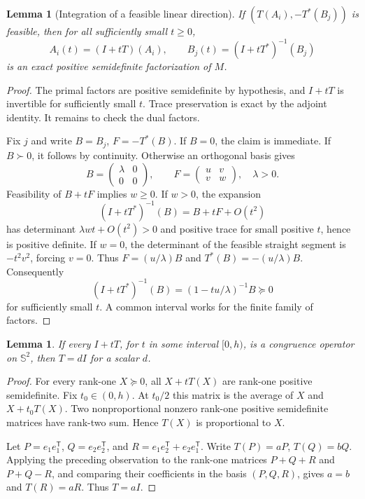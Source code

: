 \documentclass[11pt]{article}
\newtheorem{lemma}[theorem]{Lemma}
\newcommand{\Sym}{\mathbb S^2}
\begin{document}
\begin{lemma}[Integration of a feasible linear direction]\label{lem:integrate}
If $(T(A_i),-T^*(B_j))$ is feasible, then for all sufficiently small $t\geq0$,
\[
 A_i(t)=(I+tT)(A_i),\qquad
 B_j(t)=(I+tT^*)^{-1}(B_j)
\]
is an exact positive semidefinite factorization of $M$.
\end{lemma}
\begin{proof}
The primal factors are positive semidefinite by hypothesis, and $I+tT$ is invertible for sufficiently small $t$. Trace preservation is exact by the adjoint identity. It remains to check the dual factors.

Fix $j$ and write $B=B_j$, $F=-T^*(B)$. If $B=0$, the claim is immediate. If $B\succ0$, it follows by continuity. Otherwise an orthogonal basis gives
\[
 B=\begin{pmatrix}\lambda&0\\0&0\end{pmatrix},\qquad
 F=\begin{pmatrix}u&v\\v&w\end{pmatrix},\quad \lambda>0.
\]
Feasibility of $B+tF$ implies $w\geq0$. If $w>0$, the expansion
\[
 (I+tT^*)^{-1}(B)=B+tF+O(t^2)
\]
has determinant $\lambda wt+O(t^2)>0$ and positive trace for small positive $t$, hence is positive definite. If $w=0$, the determinant of the feasible straight segment is $-t^2v^2$, forcing $v=0$. Thus $F=(u/\lambda)B$ and $T^*(B)=-(u/\lambda)B$. Consequently
\[
 (I+tT^*)^{-1}(B)=(1-tu/\lambda)^{-1}B\succeq0
\]
for sufficiently small $t$. A common interval works for the finite family of factors.
\end{proof}

\begin{lemma}\label{lem:line}
If every $I+tT$, for $t$ in some interval $[0,h)$, is a congruence operator on $\Sym$, then $T=dI$ for a scalar $d$.
\end{lemma}
\begin{proof}
For every rank-one $X\succeq0$, all $X+tT(X)$ are rank-one positive semidefinite. Fix $t_0\in(0,h)$. At $t_0/2$ this matrix is the average of $X$ and $X+t_0T(X)$. Two nonproportional nonzero rank-one positive semidefinite matrices have rank-two sum. Hence $T(X)$ is proportional to $X$.

Let $P=e_1e_1^{\mathsf T}$, $Q=e_2e_2^{\mathsf T}$, and $R=e_1e_2^{\mathsf T}+e_2e_1^{\mathsf T}$. Write $T(P)=aP$, $T(Q)=bQ$. Applying the preceding observation to the rank-one matrices $P+Q+R$ and $P+Q-R$, and comparing their coefficients in the basis $(P,Q,R)$, gives $a=b$ and $T(R)=aR$. Thus $T=aI$.
\end{proof}
\end{document}
